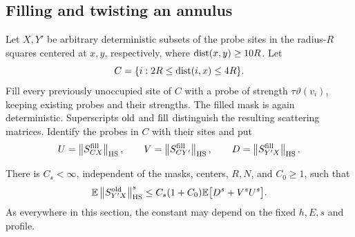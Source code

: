 \subsection{Filling and twisting an annulus}

Let \(X,Y'\) be arbitrary deterministic subsets of the probe sites in
the radius-\(R\) squares centered at \(x,y\), respectively, where
\(\operatorname{dist}(x,y)\ge10R\). Let
\[
 C=\{i:2R\le\operatorname{dist}(i,x)\le4R\}.
\]
Fill every previously unoccupied site of \(C\) with a probe of strength
\(\tau\vartheta(v_i)\), keeping existing probes and their strengths.
The filled mask is again deterministic. Superscripts \({\rm old}\) and
\({\rm fill}\) distinguish the resulting scattering matrices. Identify
the probes in \(C\) with their sites and put
\[
 U=\left\lVert S^{\rm fill}_{CX}\right\rVert_{\rm HS},\qquad
 V=\left\lVert S^{\rm fill}_{CY'}\right\rVert_{\rm HS},\qquad
 D=\left\lVert S^{\rm fill}_{Y'X}\right\rVert_{\rm HS}.
\]

\begin{lemma}\label{boot:twist}
There is \(C_s<\infty\), independent of the masks, centers, \(R,N\),
and \(C_0\ge1\), such that
\begin{equation}\label{boot:twist-ineq}
 \mathbb E\left\lVert S^{\rm old}_{Y'X}\right\rVert_{\rm HS}^{s}
     \le C_s(1+C_0)\mathbb E\bigl[D^s+V^sU^s\bigr].
\end{equation}
As everywhere in this section, the constant may depend on the fixed
\(h,E,s\) and profile.
\end{lemma}

